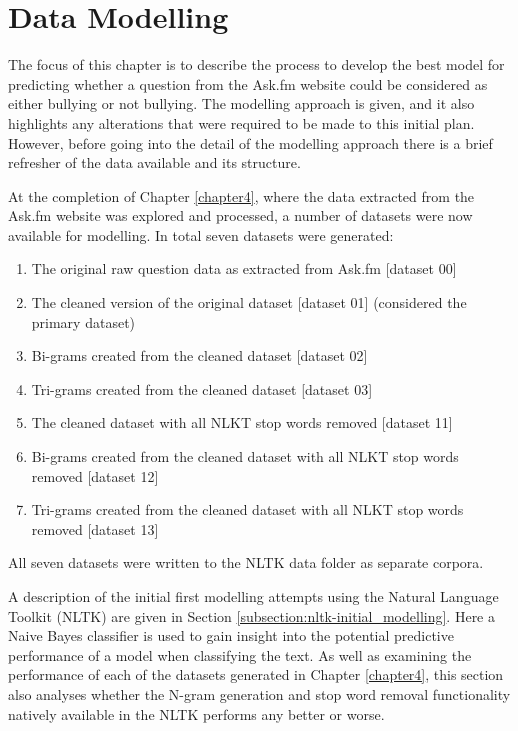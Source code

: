 
\chapter{Data Modelling} %

\label{chapter5} 


The focus of this chapter is to describe the process to develop the best model for predicting whether a question from the Ask.fm website could be considered as either bullying or not bullying. The modelling approach is given, and it also highlights any alterations that were required to be made to this initial plan. However, before going into the detail of the modelling approach there is a brief refresher of the data available and its structure.

At the completion of Chapter \ref{chapter4}, where the data extracted from the Ask.fm website was explored and processed, a number of datasets were now available for modelling. In total seven datasets were generated:

\begin{enumerate}

	\item The original raw question data as extracted from Ask.fm [dataset 00]
	\item The cleaned version of the original dataset [dataset 01] (considered the primary dataset)
	\item Bi-grams created from the cleaned dataset [dataset 02]
	\item Tri-grams created from the cleaned dataset [dataset 03]
	\item The cleaned dataset with all NLKT stop words removed [dataset 11]
	\item Bi-grams created from the cleaned dataset with all NLKT stop words removed [dataset 12]
	\item Tri-grams created from the cleaned dataset with all NLKT stop words removed [dataset 13]

\end{enumerate}

All seven datasets were written to the NLTK data folder as separate corpora. 

A description of the initial first modelling attempts using the Natural Language Toolkit (NLTK) are given in Section \ref{subsection:nltk-initial_modelling}. Here a Naive Bayes classifier is used to gain insight into the potential predictive performance of a model when classifying the text. As well as examining the performance of each of the datasets generated in Chapter \ref{chapter4}, this section also analyses whether the N-gram generation and stop word removal functionality natively available in the NLTK performs any better or worse. 

